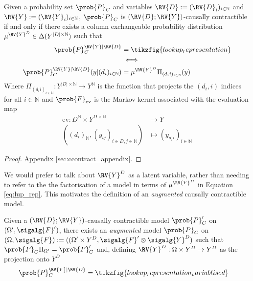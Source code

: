 \begin{theorem}\label{th:table_rep}
Given a probability set $\prob{P}_C$ and variables $\RV{D}:=(\RV{D}_i)_{i\in \mathbb{N}}$ and $\RV{Y}:=(\RV{Y}_i)_{i\in \mathbb{N}}$, $\prob{P}_C$ is  $(\RV{D};\RV{Y})$-causally contractible if and only if there exists a column exchangeable probability distribution $\mu^{\RV{Y}^D}\in \Delta(Y^{|D|\times \mathbb{N}})$ such that
\begin{align}
    \prob{P}_C^{\RV{Y}|\RV{D}} &= \tikzfig{lookup_representation}\label{eq:lup_rep}\\
    &\iff\\
    \prob{P}_C^{\RV{Y}|\RV{D}}(y|(d_i)_{i\in \mathbb{N}}) &= \mu^{\RV{Y}^D} \Pi_{(d_i i)_{i\in\mathbb{N}}}(y)
\end{align}
Where $\Pi_{(d_i i)_{i\in\mathbb{N}}}:Y^{|D|\times \mathbb{N}}\to Y^{\mathbb{N}}$ is the function that projects the $(d_i,i)$ indices for all $i\in \mathbb{N}$ and $\prob{F}_{\text{ev}}$ is the Markov kernel associated with the evaluation map
\begin{align}
    \text{ev}:D^\mathbb{N}\times Y^{D\times \mathbb{N}}&\to Y\\
    ((d_i)_\mathbb{N},(y_{ij})_{i\in D,j\in \mathbb{N}})&\mapsto (y_{d_i i})_{i\in \mathbb{N}}
\end{align}
\end{theorem}

\begin{proof}
Appendix \ref{sec:ccontract_appendix}.
\end{proof}

We would prefer to talk about $\RV{Y}^D$ as a latent variable, rather than needing to refer to the the factorisation of a model in terms of $\mu^{\RV{Y}^D}$ in Equation \ref{eq:lup_rep}. This motivates the definition of an \emph{augmented} causally contractible model.

\begin{lemma}\label{lem:aug_cc}
Given a $(\RV{D};\RV{Y})$-causally contractible model $\prob{P}_C'$ on $(\Omega',\sigalg{F}')$, there exists an \emph{augmented} model $\prob{P}_C$ on $(\Omega,\sigalg{F}):=((\Omega'\times Y^D,\sigalg{F}'\otimes\sigalg{Y}^D)$ such that $\prob{P}_C\Pi_{\Omega'}=\prob{P}_C'$ and, defining $\RV{Y}^D:\Omega\times Y^D\to Y^D$ as the projection onto $Y^D$
\begin{align}
    \prob{P}_C^{\RV{Y}|\RV{D}} &= \tikzfig{lookup_representation_variablised}\label{eq:lup_rep_varb}
\end{align}
\end{lemma}

